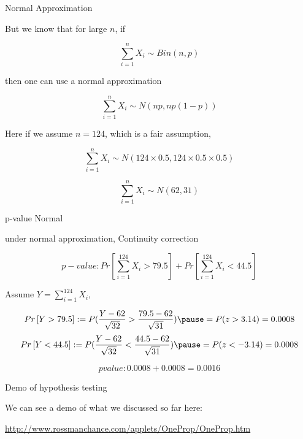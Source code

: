 \documentclass{beamer}\usepackage[]{graphicx}\usepackage[]{color}
\begin{document}
\begin{frame}{Normal Approximation}

But we know that for large $n$, if

$$ \sum_{i=1}^{n} X_{i} \sim Bin (n, p) $$

then one can use a normal approximation

$$ \sum_{i=1}^{n} X_{i} \sim N \left ( np, np(1-p)  \right) $$

Here if we assume $n=124$, which is a fair assumption,

$$ \sum_{i=1}^{n} X_{i} \sim N(124 \times 0.5, 124 \times 0.5 \times 0.5) $$

$$ \sum_{i=1}^{n} X_{i} \sim N(62, 31)  $$

\end{frame}

\begin{frame}{p-value Normal}

under normal approximation, Continuity correction

$$ p-value: Pr \left [ \sum_{i=1}^{124} X_{i} > 79.5 \right ] +  Pr \left [ \sum_{i=1}^{124} X_{i} <  44.5 \right ] $$

Assume $Y= \sum_{i=1}^{124} X_{i}$,

$$ Pr \left [ Y > 79.5 \right ] : = P( \frac{Y- 62}{\sqrt{32}} > \frac{79.5-62}{\sqrt{31}}) \pause = P(z > 3.14) =  0.0008 $$
$$ Pr \left [ Y < 44.5 \right ] : = P( \frac{Y- 62}{\sqrt{32}} < \frac{44.5-62}{\sqrt{31}}) \pause = P(z < -3.14) =  0.0008 $$

$$ pvalue: 0.0008 + 0.0008 = 0.0016 $$

\end{frame}


\begin{frame}{Demo of hypothesis testing}

We can see a demo of what we discussed so far here: \pause \newline

\url{http://www.rossmanchance.com/applets/OneProp/OneProp.htm}

\end{frame}
\end{document}
